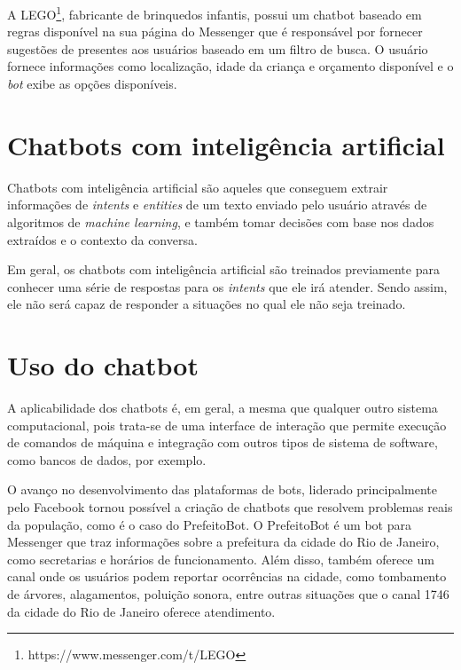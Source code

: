   A LEGO\footnote{https://www.messenger.com/t/LEGO}, fabricante de brinquedos infantis, possui um chatbot baseado em regras disponível na sua página do Messenger que é responsável por fornecer sugestões de presentes aos usuários baseado em um filtro de busca. O usuário fornece informações como localização, idade da criança e orçamento disponível e o \textit{bot} exibe as opções disponíveis.
  
  \section{Chatbots com inteligência artificial}
  Chatbots com inteligência artificial são aqueles que conseguem extrair informações de \textit{intents} e \textit{entities} de um texto enviado pelo usuário através de algoritmos de \textit{machine learning}, e também tomar decisões com base nos dados extraídos e o contexto da conversa.
  
  Em geral, os chatbots com inteligência artificial são treinados previamente para conhecer uma série de respostas para os \textit{intents} que ele irá atender. Sendo assim, ele não será capaz de responder a situações no qual ele não seja treinado.
  
  \section{Uso do chatbot}
  A aplicabilidade dos chatbots é, em geral, a mesma que qualquer outro sistema computacional, pois trata-se de uma interface de interação que permite execução de comandos de máquina e integração com outros tipos de sistema de software, como bancos de dados, por exemplo.
  
  O avanço no desenvolvimento das plataformas de bots, liderado principalmente pelo Facebook tornou possível a criação de chatbots que resolvem problemas reais da população, como é o caso do PrefeitoBot\cite{prefeitobot}. O PrefeitoBot é um bot para Messenger que traz informações sobre a prefeitura da cidade do Rio de Janeiro, como secretarias e horários de funcionamento. Além disso, também oferece um canal onde os usuários podem reportar ocorrências na cidade, como tombamento de árvores, alagamentos, poluição sonora, entre outras situações que o canal 1746 da cidade do Rio de Janeiro oferece atendimento.
  
